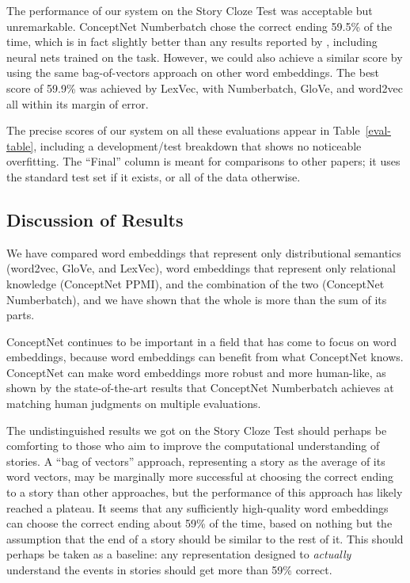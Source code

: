 \documentclass[letterpaper]{article}
\begin{document}
The performance of our system on the Story Cloze Test was acceptable but
unremarkable.  ConceptNet Numberbatch chose the correct ending 59.5\% of the
time, which is in fact slightly better than any results reported by
\citeauthor{mostafazadeh2016cloze} , including
neural nets trained on the task. However, we could also achieve a similar score
by using the same bag-of-vectors approach on other word embeddings. The best
score of 59.9\% was achieved by LexVec, with Numberbatch, GloVe, and word2vec
all within its margin of error.

The precise scores of our system on all these evaluations appear in
Table~\ref{eval-table}, including a development/test breakdown that shows no
noticeable overfitting. The ``Final'' column is meant for comparisons to other
papers; it uses the standard test set if it exists, or all of the data
otherwise.


\subsection{Discussion of Results}

We have compared word embeddings that represent only distributional semantics
(word2vec, GloVe, and LexVec), word embeddings that represent only relational
knowledge (ConceptNet PPMI), and the combination of the two (ConceptNet
Numberbatch), and we have shown that the whole is more than the sum of its
parts.

ConceptNet continues to be important in a field that has come to focus on word
embeddings, because word embeddings can benefit from what ConceptNet knows.
ConceptNet can make word embeddings more robust and more human-like, as shown
by the state-of-the-art results that ConceptNet Numberbatch achieves at
matching human judgments on multiple evaluations.

The undistinguished results we got on the Story Cloze Test should perhaps be
comforting to those who aim to improve the computational understanding of
stories.  A ``bag of vectors'' approach, representing a story as the average of
its word vectors, may be marginally more successful at choosing the correct
ending to a story than other approaches, but the performance of this approach
has likely reached a plateau. It seems that any sufficiently high-quality word
embeddings can choose the correct ending about 59\% of the time, based on
nothing but the assumption that the end of a story should be similar to the
rest of it. This should perhaps be taken as a baseline: any representation
designed to \emph{actually} understand the events in stories should get more
than 59\% correct.
\end{document}

